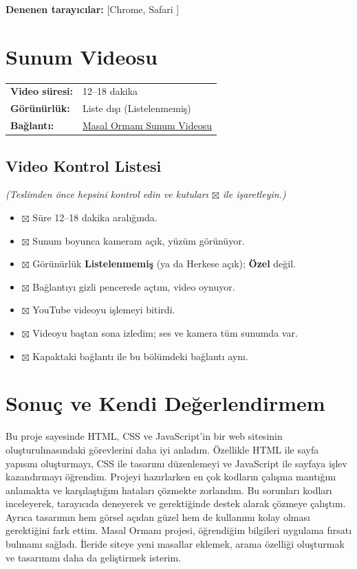 \documentclass[12pt,a4paper]{article}
\newcommand{\aciklama}[1]{{\color{gray}\itshape (#1)}}
\begin{document}
\textbf{Denenen tarayıcılar:} [Chrome,  Safari ]

\section{Sunum Videosu}
\begin{center}
\begin{tabular}{@{}ll@{}}
\textbf{Video süresi:} & 12--18 dakika \\
\textbf{Görünürlük:} & Liste dışı (Listelenmemiş) \\
\textbf{Bağlantı:} & \href{https://youtu.be/JN4zs9tCGRk}{Masal Ormanı Sunum Videosu} \\
\end{tabular}
\end{center}

\subsection{Video Kontrol Listesi}
\aciklama{Teslimden önce hepsini kontrol edin ve kutuları $\boxtimes$ ile işaretleyin.}
\begin{itemize}[label={}]
  \item $\boxtimes$ Süre 12--18 dakika aralığında.
  \item $\boxtimes$ Sunum boyunca kameram açık, yüzüm görünüyor.
  \item $\boxtimes$ Görünürlük \textbf{Listelenmemiş} (ya da Herkese açık); \textbf{Özel} değil.
  \item $\boxtimes$ Bağlantıyı gizli pencerede açtım, video oynuyor.
  \item $\boxtimes$ YouTube videoyu işlemeyi bitirdi.
  \item $\boxtimes$ Videoyu baştan sona izledim; ses ve kamera tüm sunumda var.
  \item $\boxtimes$ Kapaktaki bağlantı ile bu bölümdeki bağlantı aynı.
\end{itemize}
\section{Sonuç ve Kendi Değerlendirmem}
Bu proje sayesinde HTML, CSS ve JavaScript'in bir web sitesinin oluşturulmasındaki görevlerini daha iyi anladım. Özellikle HTML ile sayfa yapısını oluşturmayı, CSS ile tasarımı düzenlemeyi ve JavaScript ile sayfaya işlev kazandırmayı öğrendim. Projeyi hazırlarken en çok kodların çalışma mantığını anlamakta ve karşılaştığım hataları çözmekte zorlandım. Bu sorunları kodları inceleyerek, tarayıcıda deneyerek ve gerektiğinde destek alarak çözmeye çalıştım. Ayrıca tasarımın hem görsel açıdan güzel hem de kullanımı kolay olması gerektiğini fark ettim. Masal Ormanı projesi, öğrendiğim bilgileri uygulama fırsatı bulmamı sağladı. İleride siteye yeni masallar eklemek, arama özelliği oluşturmak ve tasarımını daha da geliştirmek isterim.
\end{document}
